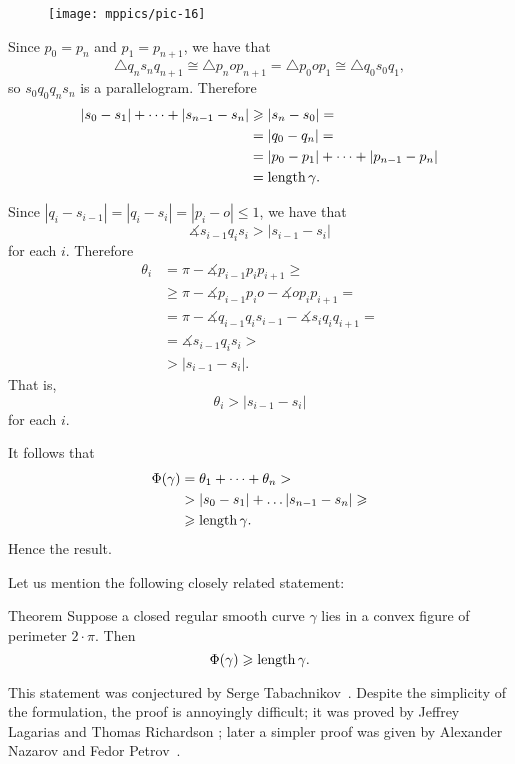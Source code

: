 \begin{figure}[h!]
\vskip-0mm
\centering
\texttt{[image: mppics/pic-16]}
\vskip0mm
\end{figure}

Since $p_0=p_n$ and $p_1=p_{n+1}$, we have that
\[\triangle q_{n}s_nq_{n+1}\cong 
\triangle p_nop_{n+1}=\triangle p_0op_1\cong\triangle q_{0}s_0q_1,\]
so $s_0q_0q_ns_n$ is a parallelogram.
Therefore
\begin{align*}
|s_0-s_1|+\dots+|s_{n-1}-s_n|
&\geqslant|s_n-s_0|=
\\
&=|q_0-q_n|=
\\
&=|p_0-p_1|+\dots+|p_{n-1}-p_n|
\\
&=\mathop{\rm length}\nolimits \gamma.
\end{align*}

Since $|q_i-s_{i-1}|=|q_i-s_i|=|p_i-o|\le 1$, we have that
\[\measuredangle s_{i-1}q_is_i>|s_{i-1}-s_i|\]%
for each $i$.
Therefore
\begin{align*}
\theta_i&=\pi-\measuredangle p_{i-1}p_ip_{i+1}\ge
\\
&\ge\pi-\measuredangle p_{i-1}p_io-\measuredangle op_ip_{i+1}=
\\
&=\pi-\measuredangle q_{i-1}q_is_{i-1}-\measuredangle s_iq_iq_{i+1}=
\\
&=\measuredangle s_{i-1}q_is_i>
\\
&>|s_{i-1}-s_i|.
\end{align*}
That is, 
\[\theta_i>|s_{i-1}-s_i|\]
for each $i$.

It follows that
\begin{align*}
\Phi({\gamma})
&=\theta_1+\dots+\theta_n>
\\
&> |s_{0}-s_1|+\dots |s_{n-1}-s_n|\geqslant 
\\
&\geqslant\mathop{\rm length}\nolimits \gamma.
\end{align*}
Hence the result.
\qeds


Let us mention the following closely related statement:

\begin{thm}{Theorem}
Suppose a closed regular smooth curve $\gamma$ lies in a convex figure of perimeter $2\cdot \pi$.
Then 
\[\Phi({\gamma})\geqslant \mathop{\rm length}\nolimits\gamma.\]

\end{thm}

This statement was conjectured by Serge Tabachnikov~\cite{tabachnikov}.
Despite the simplicity of the formulation, the proof is annoyingly difficult;
it was proved by Jeffrey Lagarias and Thomas Richardson \cite{lagarias-richardso}; later a simpler proof was given by Alexander Nazarov and Fedor Petrov~\cite{nazarov-petrov}.

